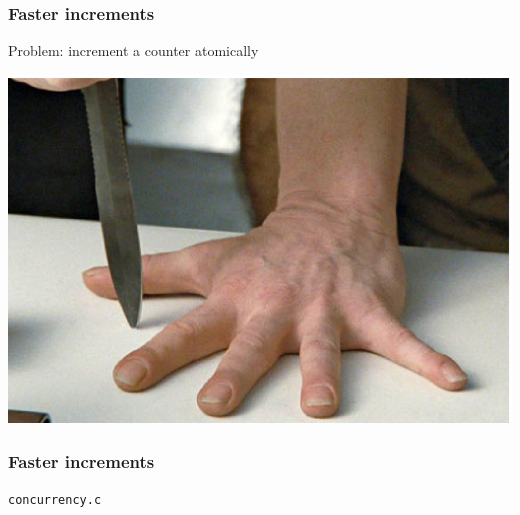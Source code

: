 \documentclass{beamer}
\begin{document}
\begin{frame}[fragile]
	\frametitle{Faster increments}
	\par Problem: increment a counter atomically 
	\begin{center}
		\includegraphics[scale = 0.6]{knife.ps}
	\end{center}
\end{frame}



\begin{frame}[fragile]
	\frametitle{Faster increments}
	\begin{center}
		\texttt{concurrency.c}
	\end{center}
\end{frame}
\end{document}
